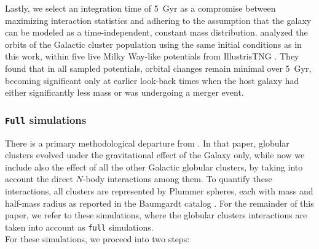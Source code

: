 \documentclass[draft]{aa}
\begin{document}
    Lastly, we select an integration time of 5~Gyr as a compromise between maximizing interaction statistics and adhering to the assumption that the galaxy can be modeled as a time-independent, constant mass distribution. \citet{2023A&A...673A.152I} analyzed the orbits of the Galactic cluster population using the same initial conditions as in this work, within five live Milky Way-like potentials from IllustrisTNG \citep{2018MNRAS.473.4077P}. They found that in all sampled potentials, orbital changes remain minimal over 5~Gyr, becoming significant only at earlier look-back times when the host galaxy had either significantly less mass or was undergoing a merger event.




    \subsubsection*{ \texttt{Full} simulations}
    There is a primary methodological departure from \citet{2023A&A...673A..44F}.  In that paper, globular clusters evolved under the gravitational effect of the Galaxy only, while now we include also the effect of all the other Galactic globular clusters, by taking into account the direct $N$-body interactions among them. To quantify these interactions, all clusters are represented by Plummer spheres, each with mass and half-mass radius as reported in the Baumgardt catalog \citep{2021MNRAS.505.5957B}. For the remainder of this paper, we refer to these simulations, where the globular clusters interactions are taken into account as \texttt{full} simulations. \\
    For these simulations, we proceed into two steps:
\end{document}
